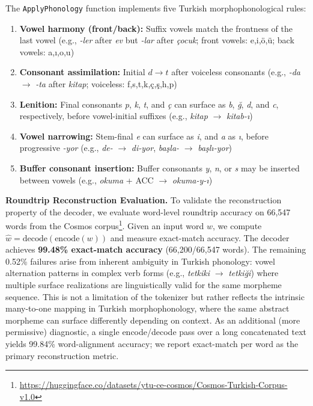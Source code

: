 The \texttt{ApplyPhonology} function implements five Turkish morphophonological rules:

\begin{enumerate}
    \item \textbf{Vowel harmony (front/back):} Suffix vowels match the frontness of the last vowel (e.g., \textit{-ler} after \textit{ev} but \textit{-lar} after \textit{çocuk}; front vowels: e,i,ö,ü; back vowels: a,ı,o,u)
    \item \textbf{Consonant assimilation:} Initial $d \to t$ after voiceless consonants (e.g., \textit{-da} $\to$ \textit{-ta} after \textit{kitap}; voiceless: f,s,t,k,ç,ş,h,p)
    \item \textbf{Lenition:} Final consonants \textit{p}, \textit{k}, \textit{t}, and \textit{ç} can surface as \textit{b}, \textit{ğ}, \textit{d}, and \textit{c}, respectively, before vowel-initial suffixes (e.g., \textit{kitap} $\to$ \textit{kitab-ı})
    \item \textbf{Vowel narrowing:} Stem-final \textit{e} can surface as \textit{i}, and \textit{a} as \textit{ı}, before progressive \textit{-yor} (e.g., \textit{de-} $\to$ \textit{di-yor}, \textit{başla-} $\to$ \textit{başlı-yor})
    \item \textbf{Buffer consonant insertion:} Buffer consonants \textit{y}, \textit{n}, or \textit{s} may be inserted between vowels (e.g., \textit{okuma} + ACC $\to$ \textit{okuma-y-ı})
\end{enumerate}

\textbf{Roundtrip Reconstruction Evaluation.} To validate the reconstruction property of the decoder, we evaluate word-level roundtrip accuracy on 66,547 words from the Cosmos corpus\footnote{\url{https://huggingface.co/datasets/ytu-ce-cosmos/Cosmos-Turkish-Corpus-v1.0}}. Given an input word $w$, we compute $\hat{w} = \text{decode}(\text{encode}(w))$ and measure exact-match accuracy. The decoder achieves \textbf{99.48\% exact-match accuracy} (66,200/66,547 words). The remaining 0.52\% failures arise from inherent ambiguity in Turkish phonology: vowel alternation patterns in complex verb forms (e.g., \textit{tetkiki} $\to$ \textit{tetkiği}) where multiple surface realizations are linguistically valid for the same morpheme sequence. This is not a limitation of the tokenizer but rather reflects the intrinsic many-to-one mapping in Turkish morphophonology, where the same abstract morpheme can surface differently depending on context. As an additional (more permissive) diagnostic, a single encode/decode pass over a long concatenated text yields 99.84\% word-alignment accuracy; we report exact-match per word as the primary reconstruction metric.

